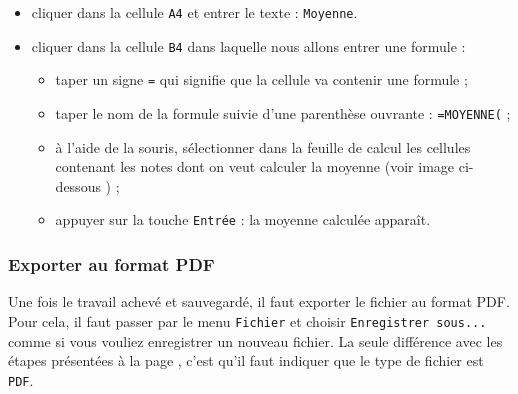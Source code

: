 \begin{itemize}
\item cliquer dans la cellule \texttt{A4} et entrer le texte : \texttt{Moyenne}. 
\item cliquer dans la cellule \texttt{B4} dans laquelle nous allons entrer une formule : 
        \begin{itemize}
        \item taper un signe \texttt{=} qui signifie que la cellule va contenir une formule ;
        \item taper le nom de la formule suivie d'une parenthèse ouvrante : \texttt{=MOYENNE(} ;
        \item à l'aide de la souris, sélectionner dans la feuille de calcul les cellules contenant les notes dont on veut calculer la moyenne (voir image ci-dessous ) ;
        \item appuyer sur la touche \texttt{Entrée} : la moyenne calculée apparaît.
        \end{itemize}
\end{itemize}



\subsubsection{Exporter au format PDF}

Une fois le travail achevé et sauvegardé, il faut exporter le fichier au format PDF. Pour cela, il faut passer par le menu \texttt{Fichier} et choisir \texttt{Enregistrer sous...} comme si vous vouliez enregistrer un nouveau fichier. La seule différence avec les étapes présentées à la page \pageref{ssec_sauvegarder_fichier}, c'est qu'il faut indiquer que le type de fichier est \texttt{PDF}. 



